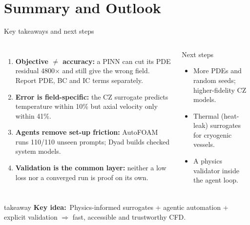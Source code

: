\documentclass[aspectratio=169,10pt,t]{beamer}
\newcommand{\key}[1]{\textcolor{qblue}{\textbf{#1}}}
\newcommand{\takeaway}[1]{%
  \par\vfill
  \begin{beamercolorbox}[wd=\linewidth,sep=5pt,rounded=true]{takeaway}
    \small\textcolor{qblue}{\textbf{Key idea:}}~#1
  \end{beamercolorbox}\vspace{1mm}}
\begin{document}
\section{Summary and Outlook}
\begin{frame}{Key takeaways and next steps}
\begin{columns}[T,onlytextwidth]
\begin{enumerate}\small\setlength{\itemsep}{3pt}
  \item \key{Objective $\neq$ accuracy:} a PINN can cut its PDE residual 4800$\times$ and still give the wrong field. Report PDE, BC and IC terms separately.
  \item \key{Error is field-specific:} the CZ surrogate predicts temperature within 10\% but axial velocity only within 41\%.
  \item \key{Agents remove set-up friction:} AutoFOAM runs 110/110 unseen prompts; Dyad builds checked system models.
  \item \key{Validation is the common layer:} neither a low loss nor a converged run is proof on its own.
\end{enumerate}
\begin{block}{Next steps}
\begin{itemize}\small
  \item More PDEs and random seeds; higher-fidelity CZ models.
  \item Thermal (heat-leak) surrogates for cryogenic vessels.
  \item A physics validator inside the agent loop.
\end{itemize}
\end{block}
\end{columns}
\takeaway{Physics-informed surrogates + agentic automation + explicit validation $\Rightarrow$ fast, accessible and trustworthy CFD.}
\end{frame}

\end{document}
